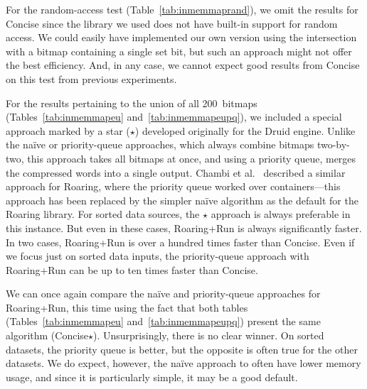 \documentclass[times]{speauth}
\begin{document}
For the random-access test (Table~\ref{tab:inmemmaprand}), we omit
the results for Concise since the library we used does not have
built-in support for random access. We could easily have implemented our own version using the intersection with a bitmap containing a single set bit, but such an approach might not offer the best efficiency. And, in any case, we cannot expect good results from Concise on this test from previous experiments.

For the results pertaining to the union of all 200~bitmaps (Tables~\ref{tab:inmemmapeu} and~\ref{tab:inmemmapeupq}), we included a
special approach marked by a star ($\star$) developed originally for the Druid engine. Unlike the na\"ive or priority-queue approaches, which always combine bitmaps two-by-two, this approach
takes all bitmaps at once, and using a priority queue, merges
the compressed words into a single output. Chambi et al.~\cite{SPE:SPE2325} described a similar approach for Roaring, where the priority queue worked over containers---this approach has been
replaced by the simpler na\"ive algorithm as the default for the Roaring library. For sorted data sources, the
$\star$
approach is always preferable in this instance. But even in these cases, Roaring+Run is always significantly faster. In two cases, Roaring+Run is  over a hundred times faster than Concise. Even if we focus just on sorted data inputs, the priority-queue approach with Roaring+Run can be up to ten times faster than Concise.


We can once again compare the na\"ive and priority-queue approaches for Roaring+Run, this time using the fact that both tables (Tables~\ref{tab:inmemmapeu} and~\ref{tab:inmemmapeupq}) present the same algorithm (Concise$\star$). Unsurprisingly, there is no clear winner. On sorted datasets, the priority queue is better, 
but the opposite is often %
true for the other datasets. We do expect, however, the na\"ive approach to often have lower memory usage, and since it is particularly simple, it
may be %
a good default.
\end{document}
